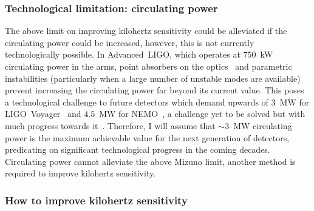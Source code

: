 \subsubsection{Technological limitation: circulating power}

The above limit on improving kilohertz sensitivity could be alleviated if the circulating power could be increased, however, this is not currently technologically possible. In Advanced~LIGO, which operates at $750$~kW circulating power in the arms, point absorbers on the optics~\cite{Brooks_2021} and parametric instabilities (particularly when a large number of unstable modes are available)~\cite{PhysRevLett.114.161102} prevent increasing the circulating power far beyond its current value. This poses a technological challenge to future detectors which demand upwards of $3$~MW for LIGO~Voyager~\cite{} and $4.5$~MW for NEMO~\cite{}, a challenge yet to be solved but with much progress towards it~\cite{}. %
Therefore, I will assume that $\sim3$~MW circulating power is the maximum achievable value for the next generation of detectors, predicating on significant technological progress in the coming decades. Circulating power cannot alleviate the above Mizuno limit, another method is required to improve kilohertz sensitivity.



\subsubsection{How to improve kilohertz sensitivity}

